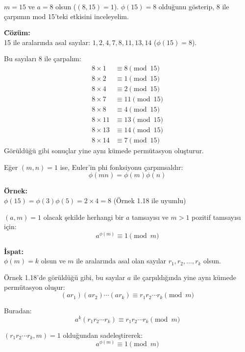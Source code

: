 \begin{tcolorbox}[colback=red!5, colframe=red!50!black, title=\textbf{\"Ornek 1.18: Mod 15'te Euler Fonksiyonu}, fonttitle=\bfseries, sharp corners]
$m = 15$ ve $a = 8$ olsun ($(8,15)=1$). $\phi(15)=8$ olduğunu g\"osterip, 8 ile çarpımın mod 15'teki etkisini inceleyelim.

\textbf{\"C\"oz\"um:}\\
15 ile aralarında asal sayılar: $1,2,4,7,8,11,13,14$ ($\phi(15)=8$).

Bu sayıları 8 ile çarpalım:
\begin{align*}
8\times1 &\equiv8 \pmod{15} \\
8\times2 &\equiv1 \pmod{15} \\
8\times4 &\equiv2 \pmod{15} \\
8\times7 &\equiv11 \pmod{15} \\
8\times8 &\equiv4 \pmod{15} \\
8\times11 &\equiv13 \pmod{15} \\
8\times13 &\equiv14 \pmod{15} \\
8\times14 &\equiv7 \pmod{15}
\end{align*}
G\"or\"uld\"uğ\"u gibi sonuçlar yine aynı k\"umede perm\"utasyon oluşturur.
\end{tcolorbox}

\vspace{2em}

\begin{tcolorbox}[colback=green!5, colframe=green!50!black, title=\textbf{Sonuç 1.4: Euler Fonksiyonunun Çarpımsallığı}, fonttitle=\bfseries, sharp corners]
Eğer $(m,n)=1$ ise, Euler'in phi fonksiyonu çarpımsaldır:
\[
\phi(mn) = \phi(m)\phi(n)
\]

\textbf{\"Ornek:}\\
$\phi(15)=\phi(3)\phi(5)=2\times4=8$ (\"Ornek 1.18 ile uyumlu)
\end{tcolorbox}

\vspace{2em}

\begin{tcolorbox}[colback=purple!5, colframe=purple!50!black, title=\textbf{Teorem 1.13: Euler Teoremi}, fonttitle=\bfseries, sharp corners]
$(a,m)=1$ olacak şekilde herhangi bir $a$ tamsayısı ve $m>1$ pozitif tamsayısı için:
\[
a^{\phi(m)} \equiv 1 \pmod{m}
\]

\textbf{İspat:}\\
$\phi(m)=k$ olsun ve $m$ ile aralarında asal olan sayılar $r_1,r_2,...,r_k$ olsun.

\"Ornek 1.18'de g\"or\"uld\"uğ\"u gibi, bu sayılar $a$ ile çarpıldığında yine aynı k\"umede perm\"utasyon oluşur:
\[
(ar_1)(ar_2)\cdots(ar_k) \equiv r_1r_2\cdots r_k \pmod{m}
\]

Buradan:
\[
a^k(r_1r_2\cdots r_k) \equiv r_1r_2\cdots r_k \pmod{m}
\]

$(r_1r_2\cdots r_k,m)=1$ olduğundan sadeleştirerek:
\[
a^{\phi(m)} \equiv 1 \pmod{m}
\]
\end{tcolorbox}

